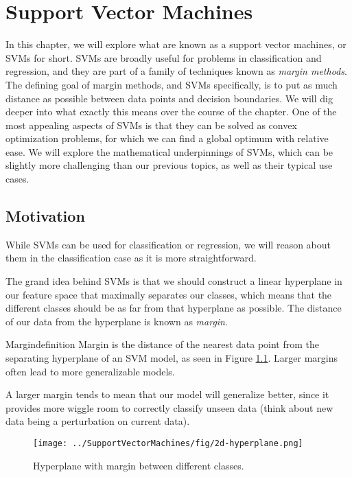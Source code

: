 \chapter{Support Vector Machines}
In this chapter, we will explore what are known as a support vector machines, or SVMs for short. SVMs are broadly useful for problems in classification and regression, and they are part of a family of techniques known as \textit{margin methods}. The defining goal of margin methods, and SVMs specifically, is to put as much distance as possible between data points and decision boundaries. We will dig deeper into what exactly this means over the course of the chapter. One of the most appealing aspects of SVMs is that they can be solved as convex optimization problems, for which we can find a global optimum with relative ease. We will explore the mathematical underpinnings of SVMs, which can be slightly more challenging than our previous topics, as well as their typical use cases.

\section{Motivation}
While SVMs can be used for classification or regression, we will reason about them in the classification case as it is more straightforward. 

The grand idea behind SVMs is that we should construct a linear hyperplane in our feature space that maximally separates our classes, which means that the different classes should be as far from that hyperplane as possible. The distance of our data from the hyperplane is known as \textit{margin}.

\begin{definition}{Margin}{definition}
Margin is the distance of the nearest data point from the separating hyperplane of an SVM model, as seen in Figure \ref{fig:2d-hyperplane}. Larger margins often lead to more generalizable models.
\end{definition}

A larger margin tends to mean that our model will generalize better, since it provides more wiggle room to correctly classify unseen data (think about new data being a perturbation on current data).

\begin{figure}
    \centering
    \texttt{[image: ../SupportVectorMachines/fig/2d-hyperplane.png]}
    \caption{Hyperplane with margin between different classes.}
    \label{fig:2d-hyperplane}
\end{figure}

